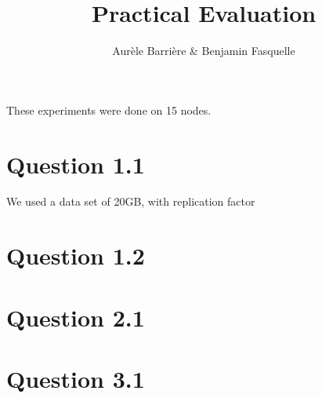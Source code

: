 \documentclass{article}
\author{Aur\`ele Barri\`ere \& Benjamin Fasquelle}
\title{Practical Evaluation}
\begin{document}
\maketitle

These experiments were done on 15 nodes.

\section*{Question 1.1}

We used a data set of 20GB, with replication factor

\section*{Question 1.2}

\section*{Question 2.1}

\section*{Question 3.1}
\end{document}
